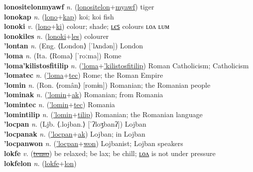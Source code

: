 \textbf{lonositelonmyawf} \textit{n.} (\hyperref[lonositelon]{lonositelon}+\hyperref[myawf]{myawf})
tiger \label{lonositelonmyawf} \\
\textbf{lonokap} \textit{n.} (\hyperref[lono]{lono}+\hyperref[kap]{kap})
koi; koi fish \label{lonokap} \\
\textbf{lonoki} \textit{v.} (\hyperref[lono]{lono}+\hyperref[ki]{ki})
colour; shade; \hyperref[lonokiles]{ʟєꜱ} colours ʟᴏᴧ ʟᴜᴍ \label{lonoki} \\
\textbf{lonokiles} \textit{n.} (\hyperref[lonoki]{lonoki}+\hyperref[les]{les})
colourer \label{lonokiles} \\
\textbf{'lontan} \textit{n.} (Eng. ⟨London⟩ [ˈlʌndən])
London \label{'lontan} \\
\textbf{'loma} \textit{n.} (Ita. ⟨Roma⟩ [ˈroːma])
Rome \label{'loma} \\
\textbf{'loma'kilistosfitilip} \textit{n.} (\hyperref['loma]{'loma}+\hyperref['kilistosfitilip]{'kilistosfitilip})
Roman Catholicism; Catholicism \label{'loma'kilistosfitilip} \\
\textbf{'lomatec} \textit{n.} (\hyperref['loma]{'loma}+\hyperref[tec]{tec})
Rome; the Roman Empire \label{'lomatec} \\
\textbf{'lomin} \textit{n.} (Ron. ⟨român⟩ [romɨn])
Romanian; the Romanian people \label{'lomin} \\
\textbf{'lominak} \textit{n.} (\hyperref['lomin]{'lomin}+\hyperref[ak]{ak})
Romanian; from Romania \label{'lominak} \\
\textbf{'lomintec} \textit{n.} (\hyperref['lomin]{'lomin}+\hyperref[tec]{tec})
Romania \label{'lomintec} \\
\textbf{'lomintilip} \textit{n.} (\hyperref['lomin]{'lomin}+\hyperref[tilip]{tilip})
Romanian; the Romanian language \label{'lomintilip} \\
\textbf{'locpan} \textit{n.} (Ljb. ⟨.lojban.⟩ [ˈʔloʒbanʔ])
Lojban \label{'locpan} \\
\textbf{'locpanak} \textit{n.} (\hyperref['locpan]{'locpan}+\hyperref[ak]{ak})
Lojban; in Lojban \label{'locpanak} \\
\textbf{'locpanwon} \textit{n.} (\hyperref['locpan]{'locpan}+\hyperref[won]{won})
Lojbanist; Lojban speakers \label{'locpanwon} \\
\textbf{lokfe} \textit{v.} (\hyperref[tenso]{\sout{tenso}})
be relaxed; be lax; be chill; \hyperref[lokfelon]{ʟᴏᴧ} is not under pressure \label{lokfe} \\
\textbf{lokfelon} \textit{n.} (\hyperref[lokfe]{lokfe}+\hyperref[lon]{lon})
